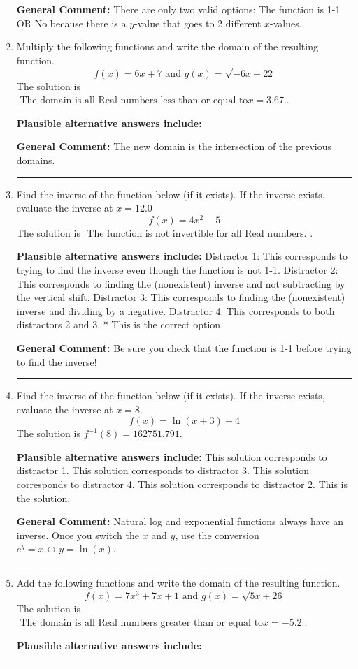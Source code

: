 \documentclass{extbook}[14pt]
\newcommand{\litem}[1]{\item #1

\rule{\textwidth}{0.4pt}}
\begin{document}
\begin{enumerate}
{\textbf{General Comment:} There are only two valid options: The function is 1-1 OR No because there is a $y$-value that goes to 2 different $x$-values.
}
\litem{
Multiply the following functions and write the domain of the resulting function.
\[ f(x) = 6x + 7 \text{ and } g(x) = \sqrt{-6x+22}  \]The solution is \( \text{ The domain is all Real numbers less than or equal to} x = 3.67. \).\begin{enumerate}[label=\Alph*.]
\textbf{Plausible alternative answers include:}




\end{enumerate}

\textbf{General Comment:} The new domain is the intersection of the previous domains.
}
\litem{
Find the inverse of the function below (if it exists). If the inverse exists, evaluate the inverse at $x = 12.0$
\[ f(x) = 4 x^2 - 5 \]The solution is \( \text{ The function is not invertible for all Real numbers. } \).\begin{enumerate}[label=\Alph*.]
\textbf{Plausible alternative answers include:} Distractor 1: This corresponds to trying to find the inverse even though the function is not 1-1. 
 Distractor 2: This corresponds to finding the (nonexistent) inverse and not subtracting by the vertical shift.
 Distractor 3: This corresponds to finding the (nonexistent) inverse and dividing by a negative.
 Distractor 4: This corresponds to both distractors 2 and 3.
* This is the correct option.
\end{enumerate}

\textbf{General Comment:} Be sure you check that the function is 1-1 before trying to find the inverse!
}
\litem{
Find the inverse of the function below (if it exists). If the inverse exists, evaluate the inverse at $x = 8$.
\[ f(x) = \ln{(x+3)}-4 \]The solution is \( f^{-1}(8) = 162751.791 \).\begin{enumerate}[label=\Alph*.]
\textbf{Plausible alternative answers include:} This solution corresponds to distractor 1.
 This solution corresponds to distractor 3.
 This solution corresponds to distractor 4.
 This solution corresponds to distractor 2.
 This is the solution.
\end{enumerate}

\textbf{General Comment:} Natural log and exponential functions always have an inverse. Once you switch the $x$ and $y$, use the conversion $ e^y = x \leftrightarrow y=\ln(x)$.
}
\litem{
Add the following functions and write the domain of the resulting function.
\[ f(x) = 7x^{3} +7 x + 1 \text{ and } g(x) = \sqrt{5x+26}  \]The solution is \( \text{ The domain is all Real numbers greater than or equal to} x = -5.2. \).\begin{enumerate}[label=\Alph*.]
\textbf{Plausible alternative answers include:}





\end{enumerate}}
\end{enumerate}
\end{document}
